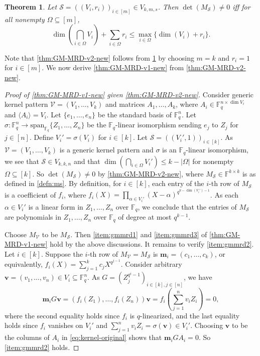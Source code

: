 \documentclass[11pt]{article}
\theoremstyle{plain}
\newtheorem{thm}{Theorem}[section]
\theoremstyle{definition}
\theoremstyle{remark}
\newcommand{\F}{\mathbb{F}}
\newcommand{\cS}{\mathcal{S}}
\newcommand{\bv}{\bm{v}}
\newcommand{\vm}{\bm{m}}
\begin{document}
\begin{thm}\label{thm:generalization-new}
Let $\cS=((V_i,r_i))_{i\in [m]}\in V_{k,m,s}$. Then $\det(M_{\cS})\neq 0$ iff for all nonempty $\Omega\subseteq [m]$, 
\begin{equation}\label{eqn:key-new}
\dim\left(\bigcap_{i\in \Omega} V_i\right)+\sum_{i\in \Omega}r_i\leq \max_{i\in \Omega}\{\dim(V_i)+r_i\}.
\end{equation}
\end{thm}

Note that \cref{thm:GM-MRD-v2-new} follows from \cref{thm:generalization-new} by choosing $m=k$ and $r_i=1$ for $i\in [m]$. 
We now derive \cref{thm:GM-MRD-v1-new} from \cref{thm:GM-MRD-v2-new}.

\begin{proof}[Proof of \cref{thm:GM-MRD-v1-new} given \cref{thm:GM-MRD-v2-new}]
Consider generic kernel pattern $\mathcal{V}=(V_1,\dots,V_k)$ and matrices $A_1,\dots,A_k$, where $A_i\in\F_q^{n\times \dim V_i}$ and $\langle A_i\rangle=V_i$. Let $\{e_1,\dots,e_n\}$ be the standard basis of $\F_q^n$.
Let $\sigma: \F_q^n\to \mathrm{span}_{\F_q}\{Z_1,\dots,Z_n\}$ be the $\F_q$-linear isomorphism sending $e_j$ to $Z_j$ for $j\in [n]$.
Define $V_i'=\sigma(V_i)$ for $i\in [k]$.
Let $\cS=((V_i',1))_{i\in [k]}$.
As $\mathcal{V}=(V_1,\dots,V_k)$ is a generic kernel pattern and $\sigma$ is an $\F_q$-linear isomorphism,
we see that $\cS\in V_{k,k,n}$ and that $\dim\left(\bigcap_{i\in \Omega} V_i'\right)\leq k-|\Omega|$ for nonempty $\Omega\subseteq [k]$. So $\det(M_{\cS})\neq 0$ by \cref{thm:GM-MRD-v2-new}, where $M_{\cS}\in\F^{k\times k}$ is as defined in \cref{defn:ms}.
By definition, for $i\in [k]$, each entry of the $i$-th row of $M_{\cS}$ is a coefficient of $f_i$, where $f_i(X)=\prod_{\alpha\in V_i'}(X-\alpha)^{q^{k-\dim(V_i')-1}}$. As each $\alpha\in V_i'$ is a linear form in $Z_1,\dots,Z_n$ over $\F_q$, we conclude that the entries of $M_{\cS}$ are polynomials in $Z_1,\dots,Z_n$ over $\F_q$ of degree at most $q^{k-1}$.

Choose $M_{\mathcal{V}}$ to be $M_{\cS}$. Then \cref{item:gmmrd1} and \cref{item:gmmrd3} of \cref{thm:GM-MRD-v1-new} hold by the above discussions. It remains to verify \cref{item:gmmrd2}. 
Let $i\in [k]$.
Suppose the $i$-th row of $M_{\mathcal{V}}=M_{\cS}$ is $\vm_i=(c_1,\dots,c_k)$, or equivalently, $f_i(X)=\sum_{j=1}^k c_j X^{q^{j-1}}$. 
Consider arbitrary $\bv=(v_1,\dots,v_n)\in V_i\subseteq \F_q^n$.
As $G=\left(Z_j^{q^i-1}\right)_{i\in [k], j\in [n]}$, we have
\begin{equation}\label{eq:kernel-original}
\vm_i G \bv=(f_i(Z_1),\dots,f_i(Z_n))\bv=f_i\left(\sum_{j=1}^n v_i Z_i\right)=0,
\end{equation}
where the second equality holds since $f_i$ is $q$-linearized, and the last equality holds since $f_i$ vanishes on $V_i'$ and $\sum_{j=1}^n v_i Z_i=\sigma(\bv)\in V_i'$.
Choosing $\bv$ to be the columns of $A_i$ in \eqref{eq:kernel-original} shows that $\vm_i G A_i=0$. So \cref{item:gmmrd2} holds. 
\end{proof}
\end{document}
